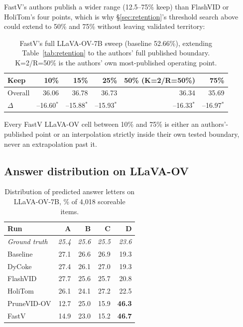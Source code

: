 \documentclass[11pt]{article}
\begin{document}
FastV's authors publish a wider range (12.5--75\% keep) than FlashVID or
HoliTom's four points, which is why \S\ref{sec:retention}'s threshold search
above could extend to 50\% and 75\% without leaving validated territory:

\begin{table}[H]
  \centering
  \small
  \caption{FastV's full LLaVA-OV-7B sweep (baseline 52.66\%), extending
  Table~\ref{tab:retention} to the authors' full published boundary.
  K=2/R=50\% is the authors' own most-published operating point.}
  \label{tab:fastvfull}
  \begin{tabular}{lrrrrr}
    \toprule
    Keep & 10\% & 15\% & 25\% & 50\% (K=2/R=50\%) & 75\% \\
    \midrule
    Overall & 36.06 & 36.78 & 36.73 & 36.34 & 35.69 \\
    $\Delta$ & --16.60$^{*}$ & --15.88$^{*}$ & --15.93$^{*}$ & --16.33$^{*}$ & --16.97$^{*}$ \\
    \bottomrule
  \end{tabular}
\end{table}

Every FastV LLaVA-OV cell between 10\% and 75\% is either an authors'-published
point or an interpolation strictly inside their own tested boundary, never
an extrapolation past it.

\subsection{Answer distribution on LLaVA-OV}
\label{sec:collapse}

\begin{table}[H]
  \centering
  \small
  \caption{Distribution of predicted answer letters on LLaVA-OV-7B, \% of
  4{,}018 scoreable items.}
  \label{tab:answers}
  \begin{tabular}{lrrrr}
    \toprule
    Run & A & B & C & D \\
    \midrule
    \textit{Ground truth} & \textit{25.4} & \textit{25.6} & \textit{25.5} & \textit{23.6} \\
    Baseline & 27.1 & 26.6 & 26.9 & 19.3 \\
    DyCoke & 27.4 & 26.1 & 27.0 & 19.3 \\
    FlashVID & 27.7 & 25.6 & 25.7 & 20.8 \\
    HoliTom & 26.1 & 24.1 & 27.2 & 22.5 \\
    PruneVID-OV & 12.7 & 25.0 & 15.9 & \textbf{46.3} \\
    FastV & 14.9 & 23.0 & 15.2 & \textbf{46.7} \\
    \bottomrule
  \end{tabular}
\end{table}
\end{document}

